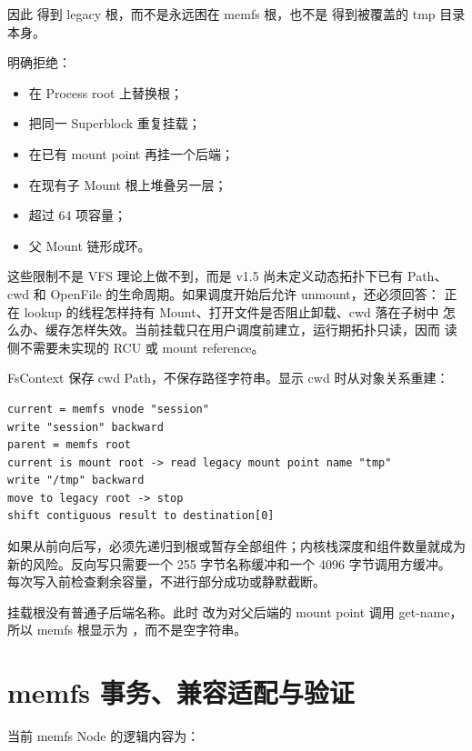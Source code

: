 因此  得到 legacy 根，而不是永远困在 memfs 根，也不是
得到被覆盖的 tmp 目录本身。

 明确拒绝：

\begin{itemize}
  \item 在 Process root 上替换根；
  \item 把同一 Superblock 重复挂载；
  \item 在已有 mount point 再挂一个后端；
  \item 在现有子 Mount 根上堆叠另一层；
  \item 超过 64 项容量；
  \item 父 Mount 链形成环。
\end{itemize}

这些限制不是 VFS 理论上做不到，而是 v1.5 尚未定义动态拓扑下已有 Path、
cwd 和 OpenFile 的生命周期。如果调度开始后允许 unmount，还必须回答：
正在 lookup 的线程怎样持有 Mount、打开文件是否阻止卸载、cwd 落在子树中
怎么办、缓存怎样失效。当前挂载只在用户调度前建立，运行期拓扑只读，因而
读侧不需要未实现的 RCU 或 mount reference。

FsContext 保存 cwd Path，不保存路径字符串。显示 cwd 时从对象关系重建：

\begin{lstlisting}[caption={从 /tmp/session 反向取得路径}]
current = memfs vnode "session"
write "session" backward
parent = memfs root
current is mount root -> read legacy mount point name "tmp"
write "/tmp" backward
move to legacy root -> stop
shift contiguous result to destination[0]
\end{lstlisting}

如果从前向后写，必须先递归到根或暂存全部组件；内核栈深度和组件数量就成为
新的风险。反向写只需要一个 255 字节名称缓冲和一个 4096 字节调用方缓冲。
每次写入前检查剩余容量，不进行部分成功或静默截断。

挂载根没有普通子后端名称。此时  改为对父后端的 mount
point 调用 get-name，所以 memfs 根显示为 ，而不是空字符串。

\section{memfs 事务、兼容适配与验证}

当前 memfs Node 的逻辑内容为：

